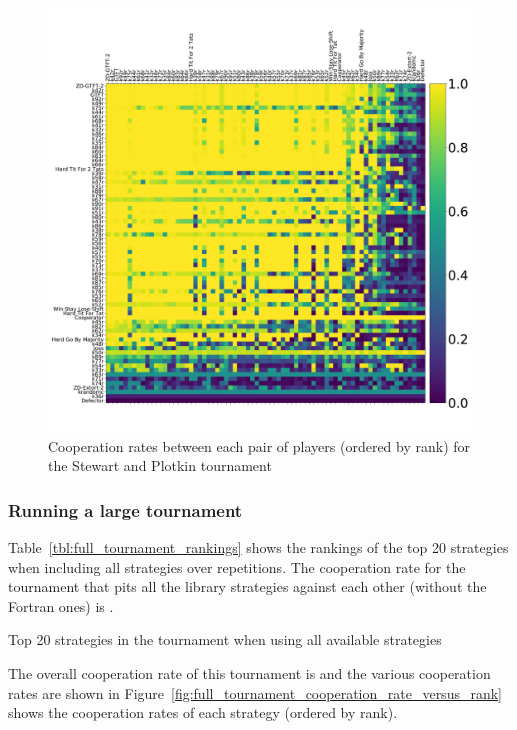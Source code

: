 \documentclass{article}
\begin{document}
\begin{figure}[!hbtp]
    \centering
    \includegraphics[width=.8\textwidth]{assets/sp_tournament_pairwise_cooperation_rates}
    \caption{Cooperation rates between each pair of players (ordered by rank)
    for the Stewart and Plotkin tournament}
    \label{fig:sp_tournament_pairwise_cooperation_rates}
\end{figure}

\subsubsection{Running a large tournament}\label{sec:run_with_everyone}

Table~\ref{tbl:full_tournament_rankings}
shows the rankings of the top 20 strategies when including all strategies over
repetitions.
The cooperation rate for the tournament that pits all the library strategies
against each other (without the Fortran ones) is
\unskip.

\begin{table}[!hbtp]
        \centering
        \footnotesize
        
        \caption{Top 20 strategies in the tournament when using all available
        strategies}
        \label{tbl:full_tournament_rankings}
\end{table}

The overall cooperation rate of this tournament is
and the various
cooperation rates are shown in
Figure~\ref{fig:full_tournament_cooperation_rate_versus_rank} shows the
cooperation rates of each strategy (ordered by rank).
\end{document}

